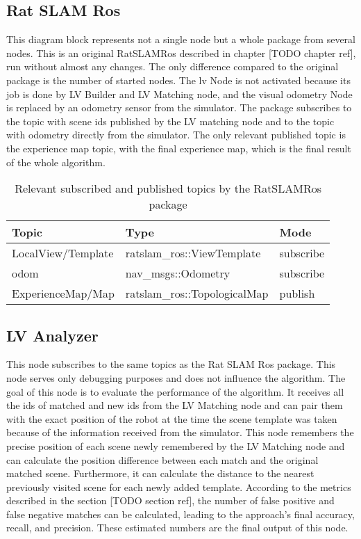 \subsection{Rat SLAM Ros}

This diagram block represents not a single node but a whole package from several nodes. This is an original RatSLAMRos described in chapter [TODO chapter ref], run without almost any changes. The only difference compared to the original package is the number of started nodes. The lv Node is not activated because its job is done by LV Builder and LV Matching node, and the visual odometry Node is replaced by an odometry sensor from the simulator. The package subscribes to the topic with scene ids published by the LV matching node and to the topic with odometry directly from the simulator. The only relevant published topic is the experience map topic, with the final experience map, which is the final result of the whole algorithm.

\begin{table}[htpb]
    \caption{Relevant subscribed and published topics by the RatSLAMRos package}\label{tab:ratslamTopics}
    \centering
    \begin{tabular}{l l l}
        \toprule
        Topic              & Type                         & Mode      \\
        \midrule
        LocalView/Template & ratslam\_ros::ViewTemplate   & subscribe \\
        odom               & nav\_msgs::Odometry          & subscribe \\
        ExperienceMap/Map  & ratslam\_ros::TopologicalMap & publish   \\
        \bottomrule
    \end{tabular}
\end{table}

\subsection{LV Analyzer}

This node subscribes to the same topics as the Rat SLAM Ros package. This node serves only debugging purposes and does not influence the algorithm. The goal of this node is to evaluate the performance of the algorithm. It receives all the ids of matched and new ids from the LV Matching node and can pair them with the exact position of the robot at the time the scene template was taken because of the information received from the simulator. This node remembers the precise position of each scene newly remembered by the LV Matching node and can calculate the position difference between each match and the original matched scene. Furthermore, it can calculate the distance to the nearest previously visited scene for each newly added template. According to the metrics described in the section [TODO section ref], the number of false positive and false negative matches can be calculated, leading to the approach's final accuracy, recall, and precision. These estimated numbers are the final output of this node.


